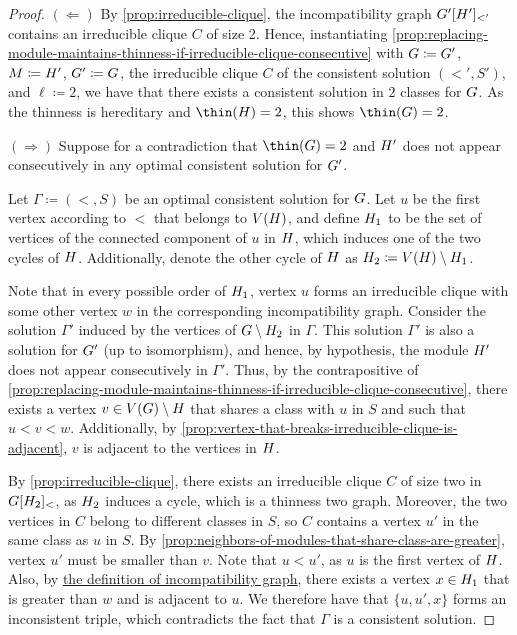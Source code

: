 \documentclass[11pt]{article}
\theoremstyle{plain}
\theoremstyle{definition}
\theoremstyle{remark}
\begin{document}
\begin{appendices}
\begin{proof}
$(\Leftarrow)$ By \cref{prop:irreducible-clique}, the incompatibility graph $G'[H']_{<'}$ contains an irreducible clique $C$ of size 2. 
Hence, instantiating \cref{prop:replacing-module-maintains-thinness-if-irreducible-clique-consecutive} with $G \coloneq G'$, $M \coloneq H'$, $G' \coloneq G$, the irreducible clique $C$ of the consistent solution $(<' ,S')$, and $\ell \coloneq 2$, we have that there exists a consistent solution in $2$ classes for $G$. As the thinness is hereditary and $\thin(\doubleCycleModule) = 2$, this shows $\thin(\doubleCycleGraph) = 2$.

$(\Rightarrow)$ Suppose for a contradiction that $\thin(\doubleCycleGraph) = 2$ and $H'$ does not appear consecutively in any optimal consistent solution for $G'$.

Let $\Gamma \coloneqq (<, S)$ be an optimal consistent solution for $G$. Let $u$ be the first vertex according to $<$ that belongs to $V(H)$, and define $H_1$ to be the set of vertices of the connected component of $u$ in $H$, which induces one of the two cycles of $H$. Additionally, denote the other cycle of $H$ as $H_2\coloneqq V(H) \setminus H_1$. 

Note that in every possible order of $H_1$, vertex $u$ forms an irreducible clique with some other vertex $w$ in the corresponding incompatibility graph. Consider the solution $\Gamma'$ induced by the vertices of $G \setminus H_2$ in $\Gamma$. This solution $\Gamma'$ is also a solution for $G'$ (up to isomorphism), and hence, by hypothesis, the module $H'$ does not appear consecutively in $\Gamma'$. Thus, by the contrapositive of \cref{prop:replacing-module-maintains-thinness-if-irreducible-clique-consecutive}, there exists a vertex $v \in V(G) \setminus H$ that shares a class with $u$ in $S$ and such that $u < v < w$. Additionally, by \cref{prop:vertex-that-breaks-irreducible-clique-is-adjacent}, $v$ is adjacent to the vertices in $H$.

By \cref{prop:irreducible-clique}, there exists an irreducible clique $C$ of size two in $G[H_2]_{<}$, as $H_2$ induces a cycle, which is a thinness two graph. Moreover, the two vertices in $C$ belong to different classes in $S$, so $C$ contains a vertex $u'$ in the same class as $u$ in $S$. By \cref{prop:neighbors-of-modules-that-share-class-are-greater}, vertex $u'$ must be smaller than $v$. Note that $u < u'$, as $u$ is the first vertex of $H$. Also, by \hyperref[def:incompatibility-graph]{the definition of incompatibility graph}, there exists a vertex $x \in H_1$ that is greater than $w$ and is adjacent to $u$. We therefore have that $\{u, u', x\}$ forms an inconsistent triple, which contradicts the fact that $\Gamma$ is a consistent solution.
\end{proof}


\end{appendices}
\end{document}
